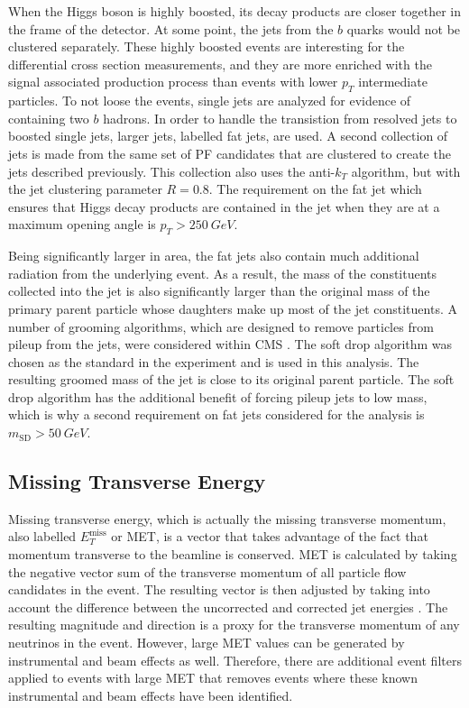 When the Higgs boson is highly boosted, its decay products are closer together
in the frame of the detector.
At some point, the jets from the $b$ quarks would not be clustered separately.
These highly boosted events are interesting for the differential cross section measurements,
and they are more enriched with the signal associated production process than
events with lower $p_T$ intermediate particles.
To not loose the events, single jets are analyzed for evidence of containing two $b$ hadrons.
In order to handle the transistion from resolved jets to boosted single jets,
larger jets, labelled fat jets, are used.
A second collection of jets is made from the same set of PF candidates that are
clustered to create the jets described previously.
This collection also uses the anti-$k_T$ algorithm,
but with the jet clustering parameter $R = 0.8$.
The requirement on the fat jet which ensures that Higgs decay products are contained
in the jet when they are at a maximum opening angle is $p_T > \SI{250}{GeV}$.

Being significantly larger in area,
the fat jets also contain much additional radiation from the underlying event.
As a result, the mass of the constituents collected into the jet
is also significantly larger than the original mass of the primary parent particle
whose daughters make up most of the jet constituents.
A number of grooming algorithms,
which are designed to remove particles from pileup from the jets,
were considered within CMS \cite{dabercro2014}.
The soft drop algorithm \cite{Larkoski_2014} was chosen as the standard in the experiment
and is used in this analysis.
The resulting groomed mass of the jet is close to its original parent particle.
The soft drop algorithm has the additional benefit of forcing pileup jets to low mass,
which is why a second requirement on fat jets considered for the analysis is
$m_\mathrm{SD} > \SI{50}{GeV}$.

\subsection{Missing Transverse Energy}

Missing transverse energy, which is actually the missing transverse momentum,
also labelled $E_T^\mathrm{miss}$ or MET,
is a vector that takes advantage of the fact that momentum
transverse to the beamline is conserved.
MET is calculated by taking the negative vector sum of the transverse momentum of
all particle flow candidates in the event.
The resulting vector is then adjusted by taking into account the difference
between the uncorrected and corrected jet energies \cite{collaboration_2015}.
The resulting magnitude and direction is a proxy for the transverse momentum of
any neutrinos in the event.
However, large MET values can be generated by instrumental and beam effects as well.
Therefore, there are additional event filters applied to events with large MET
that removes events where these known instrumental and beam effects have been identified.

